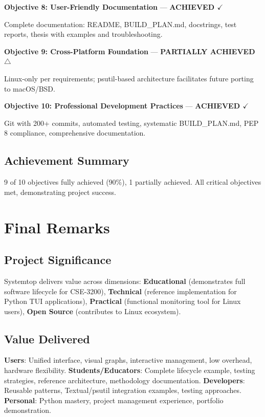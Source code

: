 \documentclass[12pt,a4paper,oneside]{report}
\begin{document}
\textbf{Objective 8: User-Friendly Documentation} --- \textbf{ACHIEVED $\checkmark$}

Complete documentation: README, BUILD\_PLAN.md, docstrings, test reports, thesis with examples and troubleshooting.

\textbf{Objective 9: Cross-Platform Foundation} --- \textbf{PARTIALLY ACHIEVED $\triangle$}

Linux-only per requirements; psutil-based architecture facilitates future porting to macOS/BSD.

\textbf{Objective 10: Professional Development Practices} --- \textbf{ACHIEVED $\checkmark$}

Git with 200+ commits, automated testing, systematic BUILD\_PLAN.md, PEP 8 compliance, comprehensive documentation.

\subsection{Achievement Summary}

9 of 10 objectives fully achieved (90\%), 1 partially achieved. All critical objectives met, demonstrating project success.

\section{Final Remarks}
\label{sec:final-remarks}

\subsection{Project Significance}

Systemtop delivers value across dimensions: \textbf{Educational} (demonstrates full software lifecycle for CSE-3200), \textbf{Technical} (reference implementation for Python TUI applications), \textbf{Practical} (functional monitoring tool for Linux users), \textbf{Open Source} (contributes to Linux ecosystem).

\subsection{Value Delivered}

\textbf{Users}: Unified interface, visual graphs, interactive management, low overhead, hardware flexibility.
\textbf{Students/Educators}: Complete lifecycle example, testing strategies, reference architecture, methodology documentation.
\textbf{Developers}: Reusable patterns, Textual/psutil integration examples, testing approaches.
\textbf{Personal}: Python mastery, project management experience, portfolio demonstration.
\end{document}
